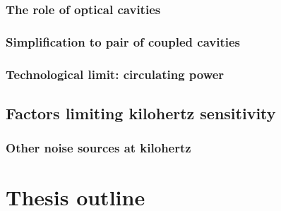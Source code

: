 \subsubsection{The role of optical cavities}


\subsubsection{Simplification to pair of coupled cavities}


\subsubsection{Technological limit: circulating power}

\subsection{Factors limiting kilohertz sensitivity}



\subsubsection{Other noise sources at kilohertz} %



\section{Thesis outline}

